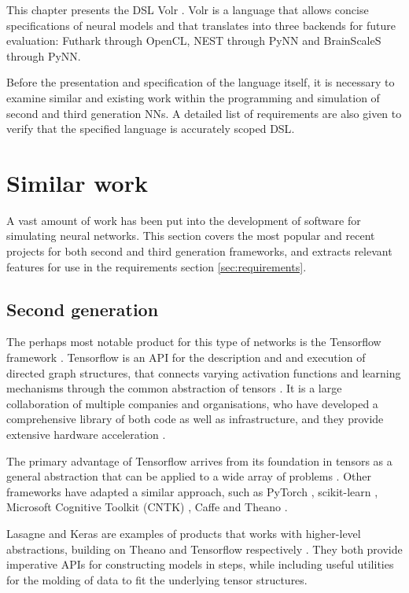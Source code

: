 \documentclass[report.tex]{subfiles}
\begin{document}
This chapter presents the \gls{DSL} Volr .
Volr is a language that allows concise specifications of 
neural models and that translates
into three backends for future evaluation:
Futhark  through \gls{OpenCL},
NEST  through PyNN  and BrainScaleS
 through PyNN.

Before the presentation and specification of the language itself, 
it is necessary to examine similar and existing work
within the programming and simulation of second and third generation
\gls{NN}s.
A detailed list of requirements are also given to verify that the
specified language is accurately scoped 
\gls{DSL}.

\section{Similar work}
A vast amount of work has been put into the development of software for simulating
neural networks.
This section covers the most popular and recent projects for both second and third
generation frameworks, and extracts relevant
features for use in the requirements section \ref{sec:requirements}.
\subsection{Second generation}
The perhaps most notable product for this type of networks is the Tensorflow 
framework \cite{Abadi2016}.
Tensorflow is an \gls{API} for the description and and execution of directed graph 
structures,
that connects varying activation functions and learning mechanisms through the common abstraction
of tensors \cite{Abadi2015}.
It is a large collaboration of multiple companies and organisations, who have
developed a comprehensive library of both code as well as infrastructure, and they
provide extensive hardware acceleration \cite{Abadi2015}.

The primary advantage of Tensorflow  arrives from 
its foundation in tensors as a general abstraction that
can be applied to a wide array of problems \cite{Abadi2016}.
Other frameworks have adapted a similar approach, such as PyTorch \cite{PyTorch2018}, 
scikit-learn \cite{Sklearn2018}, Microsoft Cognitive Toolkit (CNTK) \cite{CNTK2018},
Caffe \cite{Caffe2018} and Theano \cite{Theano2018}.

Lasagne and Keras are examples of products that works with higher-level abstractions,
building on Theano and Tensorflow respectively \cite{Lasagne2018, Keras2018}.
They both provide imperative \gls{API}s for constructing models in steps, while
including useful utilities for the molding of data to fit the underlying tensor structures.
\end{document}
